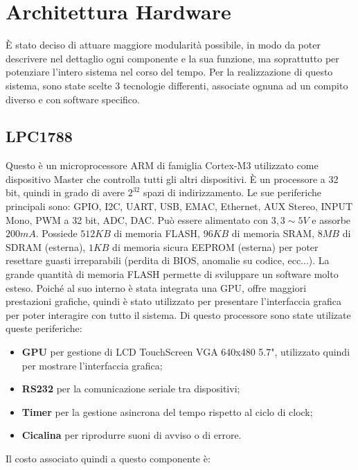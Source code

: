 \documentclass[a4paper,titlepage]{book}
\newcommand{\itema}{\begin{itemize}[noitemsep,topsep=10pt,parsep=5pt,partopsep=10pt]}
\begin{document}
\chapter{Architettura Hardware}

È stato deciso di attuare maggiore modularità possibile, in modo da poter descrivere nel dettaglio ogni componente e la sua funzione, ma soprattutto per potenziare l'intero sistema nel corso del tempo. 
Per la realizzazione di questo sistema, sono state scelte 3 tecnologie differenti, associate ognuna ad un compito diverso e con software specifico.



\section{LPC1788}


Questo è un microprocessore ARM di famiglia Cortex-M3 utilizzato come dispositivo Master che controlla tutti gli altri dispositivi. È un processore a 32 bit, quindi in grado di avere $2^{32}$ spazi di indirizzamento. Le sue periferiche principali sono: GPIO, I2C, UART, USB, EMAC, Ethernet, AUX Stereo, INPUT Mono, PWM a 32 bit, ADC, DAC. Può essere alimentato con $3,3 \sim 5 V$ e assorbe $200 mA$. Possiede $512KB$ di memoria FLASH, $96KB$ di memoria SRAM, $8MB$ di SDRAM (esterna), $1KB$ di memoria sicura EEPROM (esterna) per poter resettare guasti irreparabili (perdita di BIOS, anomalie su codice, ecc...). La grande quantità di memoria FLASH permette di sviluppare un software molto esteso. Poiché al suo interno è stata integrata una GPU, offre maggiori prestazioni grafiche, quindi è stato utilizzato per presentare l'interfaccia grafica per poter interagire con tutto il sistema. Di questo processore sono state utilizate queste periferiche:

\itema

\item \textbf{GPU} per gestione di LCD TouchScreen VGA 640x480 5.7", utilizzato quindi per mostrare l'interfaccia grafica;
\item \textbf{RS232} per la comunicazione seriale tra dispositivi;
\item \textbf{Timer} per la gestione asincrona del tempo rispetto al ciclo di clock;
\item \textbf{Cicalina} per riprodurre suoni di avviso o di errore.

\end{itemize}

Il costo associato quindi a questo componente è:
\end{document}
